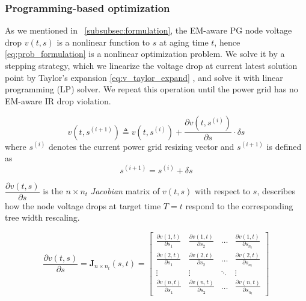\subsubsection{Programming-based optimization}
\label{subsubsec:slp_framework}

As we mentioned in ~\ref{subsubsec:formulation}, the EM-aware PG node voltage drop $v(t,s)$ is a nonlinear function to $s$ at aging time $t$, hence \eqref{eq:prob_formulation} is a nonlinear optimization problem. 
We solve it by a stepping strategy, which we linearize the voltage drop at current latest solution point by Taylor's expansion \eqref{eq:v_taylor_expand} , and solve it with linear programming (LP) solver. We repeat this operation until the power grid has no EM-aware IR drop violation.

\begin{equation}
	\label{eq:v_taylor_expand}
	v(t, s^{(i+1)}) \triangleq v(t,s^{(i)}) + \dfrac{\partial v(t, s^{(i)})}{\partial s} \cdot \delta s
\end{equation}
where $s^{(i)}$ denotes the current power grid resizing vector and $s^{(i+1)}$ is defined as 
\begin{equation}
	\label{eq:s}
	s^{(i+1)} = s^{(i)} + \delta s 
\end{equation}

$ \dfrac{\partial v(t, s)}{\partial s}$ is the $n\times n_{t}$ \textit{Jacobian} matrix of $v(t,s)$ with respect to $s$, describes how the node voltage drops at target time $T=t$ respond to the corresponding tree width rescaling.

\begin{equation}
	\label{eq:J_matrix}
	\dfrac{\partial v(t, s)}{\partial s}=
	\mathbf {J}_{n\times n_{t}}(s,t) =
	\begin{bmatrix}
		\frac{\partial v(1,t)}{\partial s_{1}}&\frac{\partial v(1,t)}{\partial s_{2}}&\ldots&\frac{\partial v(1,t)}{\partial s_{n_{t}}}\\
		\frac{\partial v(2,t)}{\partial s_{1}}&\frac{\partial v(2,t)}{\partial s_{2}}&\ldots&\frac{\partial v(2,t)}{\partial s_{n_{t}}}\\
		\vdots&\vdots&\ddots&\vdots\\
		\frac{\partial v(n,t)}{\partial s_{1}}&\frac{\partial v(n,t)}{\partial s_{2}}&\ldots&\frac{\partial v(n,t)}{\partial s_{n_{t}}}
	\end{bmatrix}
\end{equation}



